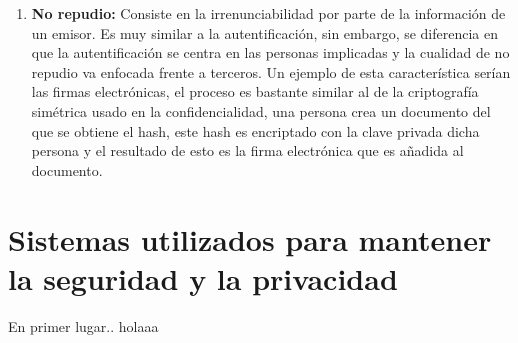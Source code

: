\begin{enumerate}
\item {\bfseries No repudio:}
Consiste en la irrenunciabilidad por parte de la información de un emisor. Es muy similar a la autentificación, sin embargo, se diferencia en que la autentificación se centra en las personas implicadas y la cualidad de no repudio va enfocada frente a terceros. Un ejemplo de esta característica serían las firmas electrónicas, el proceso es bastante similar al de la criptografía simétrica usado en la confidencialidad, una persona crea un documento del que se obtiene el hash, este hash es encriptado con la clave privada dicha persona y el resultado de esto es la firma electrónica que es añadida al documento.
\end{enumerate}



\chapter{Sistemas utilizados para mantener la seguridad y la privacidad}
\label{cha:tipos-sistemas}

En primer lugar.\cite{rstudio}. holaaa






\nocite{ransomware}
\nocite{sql_injection}
\nocite{vulnerabilidades}
\nocite{vulnerabilidades2}
\nocite{wikip}
\nocite{comision_europea}
\nocite{isot}
\nocite{gestion_activos}
\nocite{incibe2}
\nocite{herramientas-evaluacion-riesgos}
\nocite{bibdigital}
\nocite{bibdigital}





